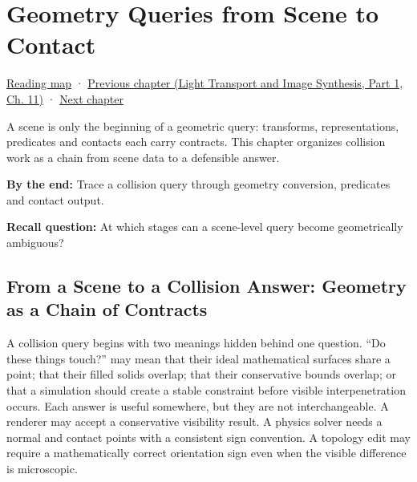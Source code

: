 \chapter{Geometry Queries from Scene to Contact}\label{03-visual-computing-i-ch020-geometry-queries-from-scene-to-contact}\hypertarget{03-visual-computing-i-ch020}{}\label{stagechapter:03-visual-computing-i-ch020}

\hypertarget{03-visual-computing-i-ch020-geometry-queries-from-scene-to-contact}{}

\hyperref[volume-reading-map]{Reading map} · \href{../04-Light-Transport-and-Image-Synthesis-P01/main.pdf\#nameddest=06-engine-ii-ch032}{Previous chapter (Light Transport and Image Synthesis, Part 1, Ch. 11)} · \hyperref[03-visual-computing-i-ch021-collision-implementations-and-repository-comparison]{Next chapter}

A scene is only the beginning of a geometric query: transforms, representations, predicates and contacts each carry contracts. This chapter organizes collision work as a chain from scene data to a defensible answer.

\textbf{By the end:} Trace a collision query through geometry conversion, predicates and contact output.

\textbf{Recall question:} At which stages can a scene-level query become geometrically ambiguous?

\section{From a Scene to a Collision Answer: Geometry as a Chain of Contracts}\label{03-visual-computing-i-ch020-from-a-scene-to-a-collision-answer-geometry-as-a-chain-of-contracts}

\hypertarget{03-visual-computing-i-ch020-from-a-scene-to-a-collision-answer-geometry-as-a-chain-of-contracts}{}

A collision query begins with two meanings hidden behind one question. ``Do these things touch?'' may mean that their ideal mathematical surfaces share a point; that their filled solids overlap; that their conservative bounds overlap; or that a simulation should create a stable constraint before visible interpenetration occurs. Each answer is useful somewhere, but they are not interchangeable. A renderer may accept a conservative visibility result. A physics solver needs a normal and contact points with a consistent sign convention. A topology edit may require a mathematically correct orientation sign even when the visible difference is microscopic.

